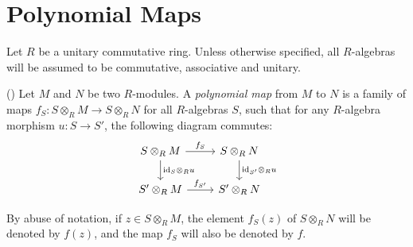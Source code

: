 %

\chapter{Polynomial Maps}

Let $R$ be a unitary commutative ring. Unless otherwise specified, all $R$-algebras will be assumed to be commutative, associative and unitary.

\begin{definition}(\cite[\S I.2]{Roby63})
	\label{def:polynomial_map}
	\leanok
	Let $M$ and $N$ be two $R$-modules. A \emph{polynomial map} from $M$ to $N$ is a family of maps $f_S : S \otimes_R M \to S \otimes_R N$ for all $R$-algebras $S$, such that for any $R$-algebra morphism $u : S \to S'$, the following diagram commutes:
	\[ \begin{tikzcd}
	S \otimes_R M \arrow[r, "f_S"] \arrow[d, "\text{id}_S \otimes_R u"]
	& S \otimes_R N \arrow[d, "\text{id}_{S'} \otimes_R u"] \\
	S' \otimes_R M \arrow[r, "f_{S'}" ]
	& S' \otimes_R N
	\end{tikzcd}\]
	 
	By abuse of notation, if $z \in S \otimes_R M$, the element $f_S(z)$ of $S \otimes_R N$ will be denoted by $f(z)$, and the map $f_S$ will also be denoted by $f$.
\end{definition}

